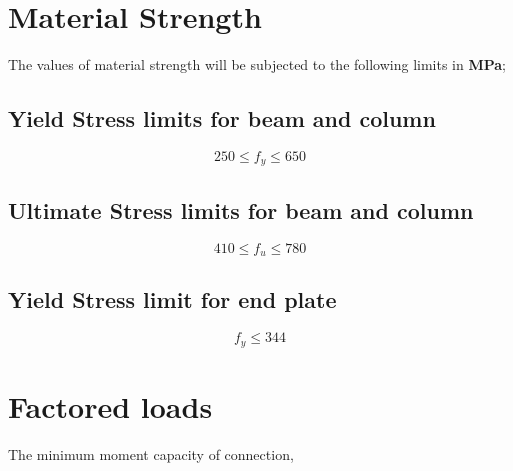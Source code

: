 \documentclass[11.5pt,a4paper,oneside]{report}
\newcommand{\okornot}{ \vspace{15mm} \hrule
	\noindent \\ \\
	Is this check \qquad
	\CheckBox[checked=False, name= ok]{\textbf{Ok}} \qquad / 
	\CheckBox[checked=False, name= notok]{\textbf{Not Ok}}\\ \\
	Comments \\ \\
	\noindent
	\TextField[name=multilinetextbox, multiline=true, width=1.0\linewidth,height=2in]{}}
\begin{document}
\begin{Form}
\chapter{Material Strength}
%

The values of material strength will be subjected to the following limits in \textbf{MPa};
\section{Yield Stress limits for beam and column}
\qquad {}
	\begin{equation}
		250 \leq f_{y} \leq 650
	\end{equation}
	
\section{Ultimate Stress limits for beam and column}
\qquad {}
	\begin{equation}
		410 \leq f_{u} \leq 780
	\end{equation}
	
\section{Yield Stress limit for end plate}
\qquad {}
\begin{equation}
	f_{y} \leq 344
\end{equation}


\chapter{Factored loads}
%

	The minimum moment capacity of connection,


\end{Form}
\end{document}
